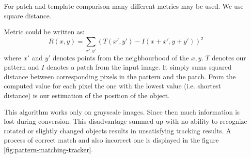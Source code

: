 For patch and template comparison many different metrics may be used. We use
square distance.

Metric could be written as:
$$
R(x, y) =
\sum_{x', y'} (T(x', y') - I(x + x', y + y'))^2
$$
where $x'$ and $y'$ denotes points from the neighbourhood of the $x, y$. $T$
denotes our pattern and $I$ denotes a patch from the input image. It simply
sums squared distance between corresponding pixels in the pattern and the
patch. From the computed value for each pixel the one with the lowest value
(i.e. shortest distance) is our estimation of the position of the object.

This algorithm works only on grayscale images. Since then much information is
lost during conversion. This disadvantage summed up with no ability to
recognize rotated or slightly changed objects results in unsatisfying tracking
results. A process of correct match and also incorrect one is displayed in the
figure
\ref{fig:pattern-matching-tracker}.

